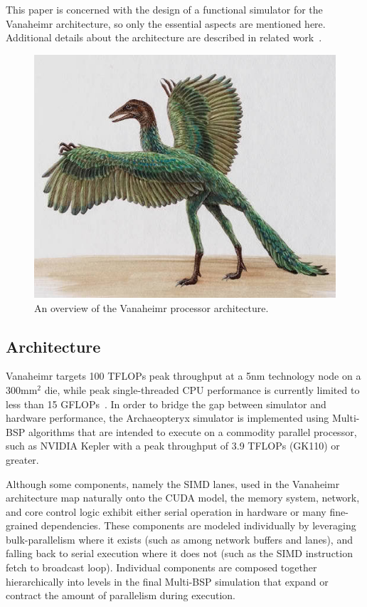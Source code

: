 \documentclass[conference, 10pt]{IEEEtran}
\begin{document}
This paper is concerned with the design of a functional simulator for the
Vanaheimr architecture, so only the essential aspects are mentioned here. 
Additional details about the architecture are described in related
work~\cite{ref:vanaheimr}.  

\begin{figure}
	\begin{center}
		\includegraphics[width=0.9\linewidth]{archaeopteryx-bird}
		\caption{An overview of the Vanaheimr processor architecture.}
		\label{fig:vanaheimr}
	\end{center}
\end{figure}

\subsection{Architecture}
Vanaheimr targets 100 TFLOPs peak throughput at a 5nm technology node on a
300mm$^2$ die, while peak single-threaded CPU performance is currently limited
to less than 15 GFLOPs~\cite{ref:sandybridge-peak}.  In order to bridge the gap
between simulator and hardware performance, the Archaeopteryx simulator is
implemented using Multi-BSP algorithms that are intended to execute on a
commodity parallel processor, such as NVIDIA Kepler with a peak throughput of
3.9 TFLOPs (GK110) or greater.

Although some components, namely the SIMD lanes, used in the Vanaheimr
architecture map naturally onto the CUDA model, the memory system, network,
and core control logic exhibit either serial operation in hardware or many
fine-grained dependencies.  These components are modeled individually by
leveraging bulk-parallelism where it exists (such as among network buffers and
lanes), and falling back to serial execution where it does not (such as the
SIMD instruction fetch to broadcast loop). Individual components are composed 
together hierarchically into levels in the final Multi-BSP simulation that
expand or contract the amount of parallelism during execution.  
\end{document}

